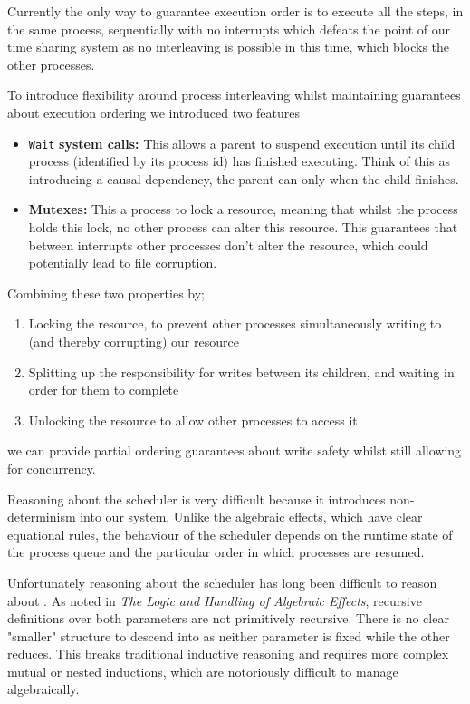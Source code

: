 \documentclass[logo,bsc,singlespacing,parskip]{infthesis}
\begin{document}
Currently the only way to guarantee execution order is to execute all the steps, in the same process, sequentially with no interrupts which defeats the point of our time sharing system as no interleaving is possible in this time, which blocks the other processes.

To introduce flexibility around process interleaving whilst maintaining guarantees about execution ordering we introduced two features
\begin{itemize}
    \item \lstinline{Wait} \textbf{system calls: } This allows a parent to suspend execution until its child process (identified by its process id) has finished executing. Think of this as introducing a causal dependency, the parent can only when the child finishes.
    \item \textbf{Mutexes: } This a process to lock a resource, meaning that whilst the process holds this lock, no other process can alter this resource. This guarantees that between interrupts other processes don't alter the resource, which could potentially lead to file corruption. 
\end{itemize}

Combining these two properties by;
\begin{enumerate}
    \item Locking the resource, to prevent other processes simultaneously writing to (and thereby corrupting) our resource
    \item Splitting up the responsibility for writes between its children, and waiting in order for them to complete
    \item Unlocking the resource to allow other processes to access it
\end{enumerate}

we can provide partial ordering guarantees about write safety whilst still allowing for concurrency.


Reasoning about the scheduler is very difficult because it introduces non-determinism into our system. Unlike the algebraic effects, which have clear equational rules, the behaviour of the scheduler depends on the runtime state of the process queue and the particular order in which processes are resumed. 

Unfortunately reasoning about the scheduler has long been difficult to reason about \cite{}. As noted in \textit{The Logic and Handling of Algebraic Effects}, recursive definitions over both parameters are not primitively recursive. There is no clear "smaller" structure to descend into as neither parameter is fixed while the other reduces. This breaks traditional inductive reasoning and requires more complex mutual or nested inductions, which are notoriously difficult to manage algebraically.
\end{document}
